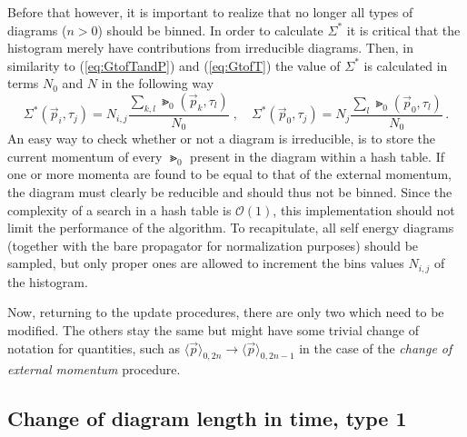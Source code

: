 Before that however, it is important to realize that no longer all types of diagrams ($ n > 0 $) should be binned. In order to calculate $ \Sigma^* $ it is critical that the histogram merely have contributions from irreducible diagrams. Then, in similarity to (\ref{eq:GtofTandP}) and (\ref{eq:GtofT}) the value of $ \Sigma^* $ is calculated in terms $ N_0 $ and $ N $ in the following way
\begin{equation}
	\label{eq:properSnormalization}
	\Sigma^* (\vec p_i, \tau_j) = N_{i,j} \frac{\sum_{k,l} \Gt_0 (\vec p_k, \tau_l)}{N_0}
	\; , \quad
	\Sigma^* (\vec p_0, \tau_j) = N_{j} \frac{\sum_{l} \Gt_0 (\vec p_0, \tau_l)}{N_0} \,.
\end{equation}
An easy way to check whether or not a diagram is irreducible, is to store the current momentum of every $ \Gt_0 $ present in the diagram within a hash table. If one or more momenta are found to be equal to that of the external momentum, the diagram must clearly be reducible and should thus not be binned. Since the complexity of a search in a hash table is $ \mathcal{O}(1) $, this implementation should not limit the performance of the algorithm. To recapitulate, all self energy diagrams (together with the bare propagator for normalization purposes) should be sampled, but only proper ones are allowed to increment the bins values $ N_{i,j} $ of the histogram.

Now, returning to the update procedures, there are only two which need to be modified. The others stay the same but might have some trivial change of notation for quantities, such as $ \langle \vec p \rangle_{0,2n} \rightarrow \langle \vec p \rangle_{0, 2n-1} $ in the case of the \textit{change of external momentum} procedure.

\subsection*{Change of diagram length in time, type 1}

